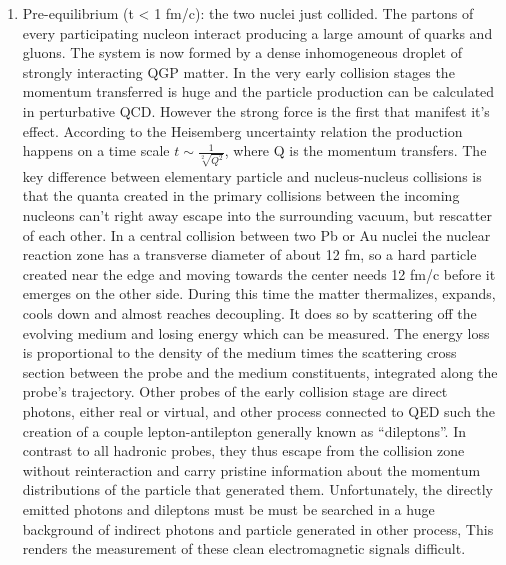 \documentclass[12pt,a4paper]{book}
\begin{document}
	\begin{enumerate}
		\item Pre-equilibrium (t < 1 fm/c): the two nuclei just collided. The partons of every
		participating nucleon interact producing a large amount of quarks and gluons. The system is now formed by a dense inhomogeneous droplet of strongly interacting QGP matter. In the very early collision stages the momentum transferred is huge and the particle production can be calculated in perturbative QCD. However the strong force is the first that manifest it's effect. According to the Heisemberg uncertainty relation the production happens on a time scale $t \sim \frac{1}{\sqrt[2]{Q^2}}$, where Q is the momentum transfers. The key difference between elementary particle and nucleus-nucleus collisions is that the quanta created in the primary collisions between the incoming nucleons can’t right away escape into the surrounding vacuum, but rescatter of each other. In a central collision between two Pb or Au nuclei the nuclear reaction zone has a transverse diameter of about 12 fm, so a hard particle created near the edge and moving towards the center needs 12 fm/c before it emerges on the other side. During this time the matter thermalizes, expands, cools down and almost reaches decoupling. It does so by scattering off the evolving medium and losing energy which can be measured. The energy loss is proportional to the density of the medium times the scattering cross section between the probe and the medium constituents, integrated along the probe’s trajectory. Other probes of the early collision stage are direct photons, either real or virtual, and other process connected to QED such the creation of a couple lepton-antilepton generally known as “dileptons”.  In contrast to all hadronic probes, they thus escape from the collision zone without reinteraction and carry pristine information about the momentum distributions of the particle that generated them. Unfortunately, the directly emitted photons and dileptons must be must be searched in a huge background of indirect photons and particle generated in other process, This renders the measurement of these clean electromagnetic signals difficult. %
		

\end{enumerate}
\end{document}
